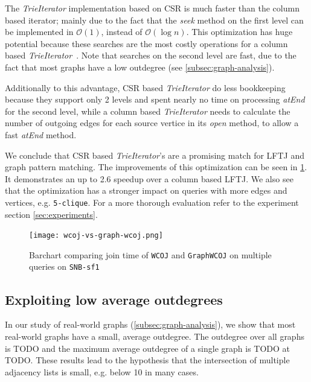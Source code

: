 The \textit{TrieIterator} implementation based on \textsc{CSR} is much faster than the column based iterator; mainly due to the fact
that the \textit{seek} method on the first level can be implemented in $\mathcal{O}(1)$, instead of $\mathcal{O}(\log n)$.
This optimization has huge potential because these searches are the most costly operations for a column based
\textit{TrieIterator}~\cite{myria-detailed}.
Note that searches on the second level are fast, due to the fact that most graphs have a low outdegree (see
\cref{subsec:graph-analysis}).

Additionally to this advantage, \textsc{CSR} based \textit{TrieIterator} do less bookkeeping because they support only 2 levels and spent
nearly no time on processing \textit{atEnd} for the second level, while a column based \textit{TrieIterator} needs to calculate the
number of outgoing edges for each source vertice in its \textit{open} method, to allow a fast \textit{atEnd} method.

We conclude that \textsc{CSR} based \textit{TrieIterator}'s are a promising match for \textsc{LFTJ} and graph pattern matching.
The improvements of this optimization can be seen in \cref{fig:wcoj-vs-graphWCOJ}.
It demonstrates an up to 2.6 speedup over a column based \textsc{LFTJ}. %
We also see that the optimization has a stronger impact on queries with more edges and vertices, e.g. \texttt{5-clique}.
For a more thorough evaluation refer to the experiment section \ref{sec:experiments}.

\begin{figure}
\centering
\texttt{[image: wcoj-vs-graph-wcoj.png]}
\caption{Barchart comparing join time of \texttt{WCOJ} and \texttt{GraphWCOJ} on multiple queries on \texttt{SNB-sf1}}
\label{fig:wcoj-vs-graphWCOJ}
\end{figure}

\subsection{Exploiting low average outdegrees} \label{subsec:graphWCOJ-materalization}

In our study of real-world graphs (\cref{subsec:graph-analysis}), we show that most real-world graphs have a small, average outdegree.
The outdegree over all graphs is TODO and the maximum average outdegree of a single graph
is TODO at TODO.
These results lead to the hypothesis that the intersection of multiple adjacency lists is small, e.g. below 10 in many cases.

